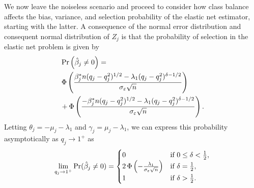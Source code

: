We now leave the noiseless scenario and proceed to consider how class balance affects the
bias, variance, and selection probability of the elastic net estimator, starting with the
latter. A consequence of the normal error distribution and consequent normal distribution
of \({Z_j}\) is that the probability of selection in the elastic net problem is given by
\begin{align}
  \label{eq:selection-probability}
   & \Pr\left(\hat{\beta}_j \neq 0\right) =                                                                                                       \nonumber
  \\
   & \operatorname{\Phi} \left( \frac{\beta_j^*n (q_j-q_j^2)^{1/2} - \lambda_1(q_j-q_j^2)^{\delta - 1/2}}{\sigma_\varepsilon \sqrt{n}}\right)                \nonumber     \\
   & + \operatorname{\Phi} \left( \frac{-\beta_j^*n (q_j-q_j^2)^{1/2} - \lambda_1(q_j-q_j^2)^{\delta - 1/2}}{\sigma_\varepsilon \sqrt{n}}\right).
\end{align}
Letting \(\theta_j = -\mu_j - \lambda_1 \) and \(\gamma_j = \mu_j - \lambda_1\), we can
express this probability asymptotically as \(q_j \rightarrow 1^+\) as
\begin{equation}
  \label{eq:selection-probability-limit}
  \lim_{q_j \rightarrow 1^+} \Pr(\hat{\beta}_j \neq 0) =
  \begin{cases}
    0                                                                & \text{if } 0 \leq \delta < \frac{1}{2}, \\
    2\operatorname{\Phi}\left(-\frac{\lambda_1}{\sigma_\varepsilon \sqrt{n}}\right) & \text{if } \delta = \frac{1}{2},        \\
    1                                                                & \text{if } \delta > \frac{1}{2}.
  \end{cases}
\end{equation}

